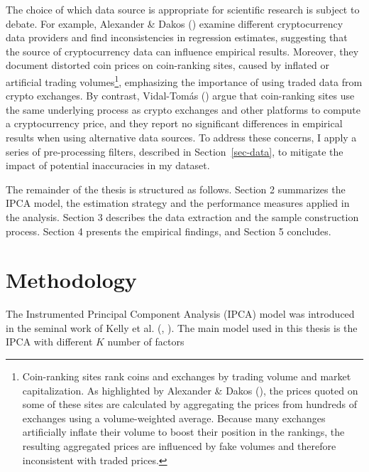 \documentclass[
  12pt,
  a4paper,
  openany]{scrbook}
\begin{document}
The choice of which data source is appropriate for scientific research
is subject to debate. For example, Alexander \& Dakos
() examine
different cryptocurrency data providers and find inconsistencies in
regression estimates, suggesting that the source of cryptocurrency data
can influence empirical results. Moreover, they document distorted coin
prices on coin-ranking sites, caused by inflated or artificial trading
volumes\footnote{Coin-ranking sites rank coins and exchanges by trading
  volume and market capitalization. As highlighted by Alexander \& Dakos
  (), the prices
  quoted on some of these sites are calculated by aggregating the prices
  from hundreds of exchanges using a volume-weighted average. Because
  many exchanges artificially inflate their volume to boost their
  position in the rankings, the resulting aggregated prices are
  influenced by fake volumes and therefore inconsistent with traded
  prices.}, emphasizing the importance of using traded data from crypto
exchanges. By contrast, Vidal-Tomás
() argue that
coin-ranking sites use the same underlying process as crypto exchanges
and other platforms to compute a cryptocurrency price, and they report
no significant differences in empirical results when using alternative
data sources. To address these concerns, I apply a series of
pre-processing filters, described in Section~\ref{sec-data}, to mitigate
the impact of potential inaccuracies in my dataset.

The remainder of the thesis is structured as follows. Section 2
summarizes the IPCA model, the estimation strategy and the performance
measures applied in the analysis. Section 3 describes the data
extraction and the sample construction process. Section 4 presents the
empirical findings, and Section 5 concludes.


\chapter{Methodology}\label{sec-methodology}

The Instrumented Principal Component Analysis (IPCA) model was
introduced in the seminal work of Kelly et al.
(,
). The main model
used in this thesis is the IPCA with different \(K\) number of factors
\end{document}

